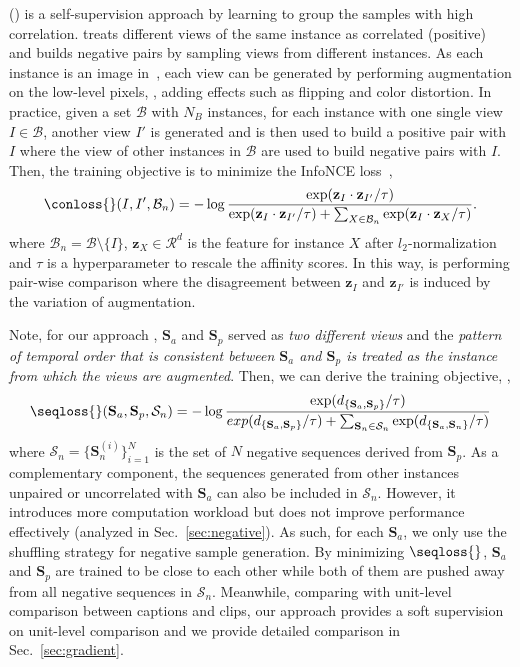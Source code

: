  (\ctloss{}) is a self-supervision approach by learning to group the samples with high correlation. \ctloss{} treats different views of the same instance as correlated (positive) and builds negative pairs by sampling views from different instances. 
As each instance is an image in~\citet{chen2020simple}, each view can be generated by performing augmentation on the low-level pixels, \ie, adding effects such as flipping and color distortion.
In practice, given a set $\mathcal{B}$ with $N_B$ instances, for each instance with one single view $I \in \mathcal{B}$, another view $I'$ is generated and is then used to build a positive pair with $I$ where the view of other instances in $\mathcal{B}$ are used to build negative pairs with $I$. Then, the training objective is to minimize the InfoNCE loss~\citep{oord2018representation},
\begin{equation}\label{eq:Con}
    \conloss{}(I,I',\mathcal{B}_n) = -\log \frac{\exp(\mathbf{z}_{I} \cdot \mathbf{z}_{I'} / \tau )}{\exp(\mathbf{z}_{I} \cdot \mathbf{z}_{I'} / \tau ) + \sum\nolimits_{X \in \mathcal{B}_n} \exp( \mathbf{z}_{I} \cdot \mathbf{z}_{X}  / \tau )}.
\end{equation}
\noindent where $\mathcal{B}_n = \mathcal{B} \setminus \{I\}$, $\mathbf{z}_{X} \in \mathcal{R}^d$ is the feature for instance $X$ after $l_2$-normalization and $\tau$ is a hyperparameter to rescale the affinity scores. 
In this way, \ctloss{} is performing pair-wise comparison where the disagreement between $\mathbf{z}_{I}$ and $\mathbf{z}_{I'}$ is induced by the variation of augmentation.

Note, for our approach \approach{}, $\mathbf{S}_a$ and $\mathbf{S}_p$ served as \emph{two different views} and the \emph{pattern of temporal order that is consistent between $\mathbf{S}_a$ and $\mathbf{S}_p$ is treated as the instance from which the views are augmented}.
Then, we can derive the training objective, \ie, 
\begin{equation}\label{eq:approach}
    \seqloss{}(\mathbf{S}_a,\mathbf{S}_p,\mathcal{S}_n) = - \log \frac{\exp(d_{\{\mathbf{S}_a,\mathbf{S}_p\}} / \tau )}{exp(d_{\{\mathbf{S}_a,\mathbf{S}_p\}} / \tau ) + \sum\nolimits_{\mathbf{S}_n \in \mathcal{S}_n} \exp( d_{\{\mathbf{S}_a,\mathbf{S}_n\}}  / \tau )}
\end{equation}
\noindent where $\mathcal{S}_n = \{\mathbf{S}_{n}^{(i)}\}_{i=1}^{N}$ is the set of $N$ negative sequences derived from $\mathbf{S}_p$.
As a complementary component, the sequences generated from other instances unpaired or uncorrelated with $\mathbf{S}_a$ can also be included in $\mathcal{S}_n$. However, it introduces more computation workload but does not improve performance effectively (analyzed in Sec.~\ref{sec:negative}). As such, for each $\mathbf{S}_a$, we only use the shuffling strategy for negative sample generation. 
By minimizing $\seqloss{}$, $\mathbf{S}_a$ and $\mathbf{S}_p$ are trained to be close to each other while both of them are pushed away from all negative sequences in $\mathcal{S}_n$. Meanwhile, comparing with unit-level comparison between captions and clips, our approach provides a soft supervision on unit-level comparison and we provide detailed comparison in Sec.~\ref{sec:gradient}.

